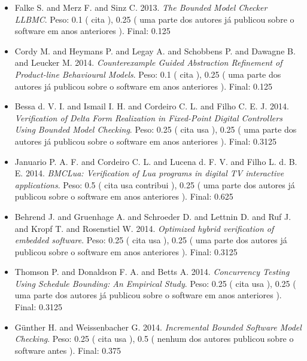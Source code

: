 \begin{itemize}
\item Falke S. and Merz F. and Sinz C.
      2013.
        \textit{ The Bounded Model Checker LLBMC}.
      Peso:
      0.1 (
          cita
      ),
      0.25 (
uma parte dos autores já publicou sobre o software em anos anteriores
      ).
      Final:
      0.125

\item Cordy M. and Heymans P. and Legay A. and Schobbens P. and Dawagne B. and Leucker M.
      2014.
        \textit{ Counterexample Guided Abstraction Refinement of Product-line Behavioural Models}.
      Peso:
      0.1 (
          cita
      ),
      0.25 (
uma parte dos autores já publicou sobre o software em anos anteriores
      ).
      Final:
      0.125

\item Bessa d. V. I. and Ismail I. H. and Cordeiro C. L. and Filho C. E. J.
      2014.
        \textit{ Verification of Delta Form Realization in Fixed-Point Digital Controllers Using Bounded Model Checking}.
      Peso:
      0.25 (
          cita
          usa
      ),
      0.25 (
uma parte dos autores já publicou sobre o software em anos anteriores
      ).
      Final:
      0.3125

\item Januario P. A. F. and Cordeiro C. L. and Lucena d. F. V. and Filho L. d. B. E.
      2014.
        \textit{ BMCLua: Verification of Lua programs in digital TV interactive applications}.
      Peso:
      0.5 (
          cita
          usa
          contribui
      ),
      0.25 (
uma parte dos autores já publicou sobre o software em anos anteriores
      ).
      Final:
      0.625

\item Behrend J. and Gruenhage A. and Schroeder D. and Lettnin D. and Ruf J. and Kropf T. and Rosenstiel W.
      2014.
        \textit{ Optimized hybrid verification of embedded software}.
      Peso:
      0.25 (
          cita
          usa
      ),
      0.25 (
uma parte dos autores já publicou sobre o software em anos anteriores
      ).
      Final:
      0.3125

\item Thomson P. and Donaldson F. A. and Betts A.
      2014.
        \textit{ Concurrency Testing Using Schedule Bounding: An Empirical Study}.
      Peso:
      0.25 (
          cita
          usa
      ),
      0.25 (
uma parte dos autores já publicou sobre o software em anos anteriores
      ).
      Final:
      0.3125

\item G\"{u}nther H. and Weissenbacher G.
      2014.
        \textit{ Incremental Bounded Software Model Checking}.
      Peso:
      0.25 (
          cita
          usa
      ),
      0.5 (
nenhum dos autores publicou sobre o software antes
      ).
      Final:
      0.375


\end{itemize}
